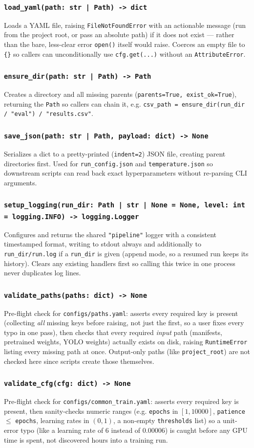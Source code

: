 \documentclass[11pt]{article}
\newcommand{\func}[1]{\subsubsection*{\texttt{#1}}}
\begin{document}
\func{load\_yaml(path: str | Path) -> dict}
Loads a YAML file, raising \texttt{FileNotFoundError} with an actionable message
(run from the project root, or pass an absolute path) if it does not exist ---
rather than the bare, less-clear error \texttt{open()} itself would raise.
Coerces an empty file to \texttt{\{\}} so callers can unconditionally use
\texttt{cfg.get(...)} without an \texttt{AttributeError}.

\func{ensure\_dir(path: str | Path) -> Path}
Creates a directory and all missing parents (\texttt{parents=True,
exist\_ok=True}), returning the \texttt{Path} so callers can chain it, e.g.
\texttt{csv\_path = ensure\_dir(run\_dir / "eval") / "results.csv"}.

\func{save\_json(path: str | Path, payload: dict) -> None}
Serializes a dict to a pretty-printed (\texttt{indent=2}) JSON file, creating
parent directories first. Used for \texttt{run\_config.json} and
\texttt{temperature.json} so downstream scripts can read back exact
hyperparameters without re-parsing CLI arguments.

\func{setup\_logging(run\_dir: Path | str | None = None, level: int = logging.INFO) -> logging.Logger}
Configures and returns the shared \texttt{"pipeline"} logger with a consistent
timestamped format, writing to stdout always and additionally to
\texttt{run\_dir/run.log} if a \texttt{run\_dir} is given (append mode, so a
resumed run keeps its history). Clears any existing handlers first so calling
this twice in one process never duplicates log lines.

\func{validate\_paths(paths: dict) -> None}
Pre-flight check for \texttt{configs/paths.yaml}: asserts every required key is
present (collecting \emph{all} missing keys before raising, not just the first,
so a user fixes every typo in one pass), then checks that every required
\emph{input} path (manifests, pretrained weights, YOLO weights) actually exists
on disk, raising \texttt{RuntimeError} listing every missing path at once.
Output-only paths (like \texttt{project\_root}) are not checked here since
scripts create those themselves.

\func{validate\_cfg(cfg: dict) -> None}
Pre-flight check for \texttt{configs/common\_train.yaml}: asserts every required
key is present, then sanity-checks numeric ranges (e.g. \texttt{epochs} in
$[1, 10000]$, \texttt{patience} $\le$ \texttt{epochs}, learning rates in $(0,1)$,
a non-empty \texttt{thresholds} list) so a unit-error typo (like a learning rate
of 6 instead of 0.00006) is caught before any GPU time is spent, not discovered
hours into a training run.
\end{document}
